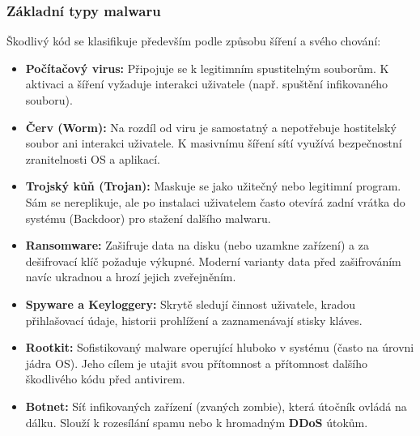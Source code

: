 \subsubsection*{Základní typy malwaru}
Škodlivý kód se klasifikuje především podle způsobu šíření a svého chování:
\begin{itemize}
    \item \textbf{Počítačový virus:} Připojuje se k legitimním spustitelným souborům. K aktivaci a šíření vyžaduje interakci uživatele (např. spuštění infikovaného souboru).
    \item \textbf{Červ (Worm):} Na rozdíl od viru je samostatný a nepotřebuje hostitelský soubor ani interakci uživatele. K masivnímu šíření sítí využívá bezpečnostní zranitelnosti OS a aplikací.
    \item \textbf{Trojský kůň (Trojan):} Maskuje se jako užitečný nebo legitimní program. Sám se nereplikuje, ale po instalaci uživatelem často otevírá zadní vrátka do systému (Backdoor) pro stažení dalšího malwaru.
    \item \textbf{Ransomware:} Zašifruje data na disku (nebo uzamkne zařízení) a za dešifrovací klíč požaduje výkupné. Moderní varianty data před zašifrováním navíc ukradnou a hrozí jejich zveřejněním.
    \item \textbf{Spyware a Keyloggery:} Skrytě sledují činnost uživatele, kradou přihlašovací údaje, historii prohlížení a zaznamenávají stisky kláves.
    \item \textbf{Rootkit:} Sofistikovaný malware operující hluboko v systému (často na úrovni jádra OS). Jeho cílem je utajit svou přítomnost a přítomnost dalšího škodlivého kódu před antivirem.
    \item \textbf{Botnet:} Síť infikovaných zařízení (zvaných zombie), která útočník ovládá na dálku. Slouží k rozesílání spamu nebo k hromadným \textbf{DDoS} útokům.
\end{itemize}

